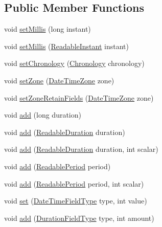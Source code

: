 \subsection*{Public Member Functions}
\begin{DoxyCompactItemize}
\item 
void \hyperlink{interfaceorg_1_1joda_1_1time_1_1_read_writable_instant_ae90bda5043ad45feb53af6f3ee29335b}{set\-Millis} (long instant)
\item 
void \hyperlink{interfaceorg_1_1joda_1_1time_1_1_read_writable_instant_a77145ef36c6eb178960208b1f5e55469}{set\-Millis} (\hyperlink{interfaceorg_1_1joda_1_1time_1_1_readable_instant}{Readable\-Instant} instant)
\item 
void \hyperlink{interfaceorg_1_1joda_1_1time_1_1_read_writable_instant_a21aed832c2b30b4f22e6a0ccd9299583}{set\-Chronology} (\hyperlink{classorg_1_1joda_1_1time_1_1_chronology}{Chronology} chronology)
\item 
void \hyperlink{interfaceorg_1_1joda_1_1time_1_1_read_writable_instant_adcb4582ac7c3e9f44628ac0a78bf09cd}{set\-Zone} (\hyperlink{classorg_1_1joda_1_1time_1_1_date_time_zone}{Date\-Time\-Zone} zone)
\item 
void \hyperlink{interfaceorg_1_1joda_1_1time_1_1_read_writable_instant_a9f6a78cba16191727a1cdfbd89886d73}{set\-Zone\-Retain\-Fields} (\hyperlink{classorg_1_1joda_1_1time_1_1_date_time_zone}{Date\-Time\-Zone} zone)
\item 
void \hyperlink{interfaceorg_1_1joda_1_1time_1_1_read_writable_instant_aa8a9aa3306c0680e48e255df2eebc044}{add} (long duration)
\item 
void \hyperlink{interfaceorg_1_1joda_1_1time_1_1_read_writable_instant_a1475f7aa1688ba8723f3c0f2c2c351b9}{add} (\hyperlink{interfaceorg_1_1joda_1_1time_1_1_readable_duration}{Readable\-Duration} duration)
\item 
void \hyperlink{interfaceorg_1_1joda_1_1time_1_1_read_writable_instant_ade14401563b31ecda92112f996166d8e}{add} (\hyperlink{interfaceorg_1_1joda_1_1time_1_1_readable_duration}{Readable\-Duration} duration, int scalar)
\item 
void \hyperlink{interfaceorg_1_1joda_1_1time_1_1_read_writable_instant_a8dd72f461dae1a3cd0797fce39ddd647}{add} (\hyperlink{interfaceorg_1_1joda_1_1time_1_1_readable_period}{Readable\-Period} period)
\item 
void \hyperlink{interfaceorg_1_1joda_1_1time_1_1_read_writable_instant_a5639e47f6079a4607e7a07727aea4d76}{add} (\hyperlink{interfaceorg_1_1joda_1_1time_1_1_readable_period}{Readable\-Period} period, int scalar)
\item 
void \hyperlink{interfaceorg_1_1joda_1_1time_1_1_read_writable_instant_a8933cef336fd354fe46882c57f6e1c8e}{set} (\hyperlink{classorg_1_1joda_1_1time_1_1_date_time_field_type}{Date\-Time\-Field\-Type} type, int value)
\item 
void \hyperlink{interfaceorg_1_1joda_1_1time_1_1_read_writable_instant_a14e0428dc39c6ac3e348e20c50265d77}{add} (\hyperlink{classorg_1_1joda_1_1time_1_1_duration_field_type}{Duration\-Field\-Type} type, int amount)
\end{DoxyCompactItemize}


